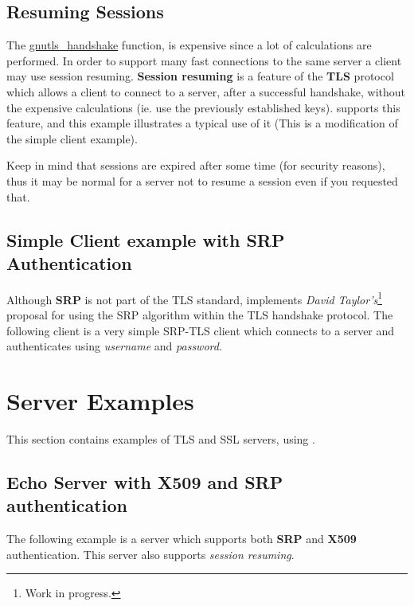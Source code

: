 \documentclass{book}
\begin{document}


\subsection{Resuming Sessions}
\par
The 
\hyperref{gnutls\_handshake()}{gnutls\_handshake() (see Section }{ for more information)}{gnutls_handshake}
 function, is expensive since
a lot of calculations are performed. In order to support many fast connections to
the same server a client may use session resuming. {\bf Session resuming} is a
feature of the {\bf TLS} protocol which allows a client to connect to a server,
after a successful handshake, without the expensive calculations (ie. use the previously
established keys). \gnutls supports this feature, and this example illustrates a
typical use of it (This is a modification of the simple client example).

\par
Keep in mind that sessions are expired after some time (for security reasons), thus
it may be normal for a server not to resume a session even if you requested that.



\subsection{Simple Client example with SRP Authentication}
Although {\bf SRP} is not part of the TLS standard, \gnutls implements
{\it David Taylor's}\footnote{Work in progress.} proposal for using the SRP algorithm
within the TLS handshake protocol. The following client
is a very simple SRP-TLS client which connects to a server 
and authenticates using {\it username} and {\it password}.



\section{Server Examples}
This section contains examples of TLS and SSL servers, using \gnutls.

\subsection{Echo Server with X509 and SRP authentication}
The following example is a server which supports both {\bf SRP} and {\bf X509} authentication.
This server also supports {\it session resuming}.





\end{document}
